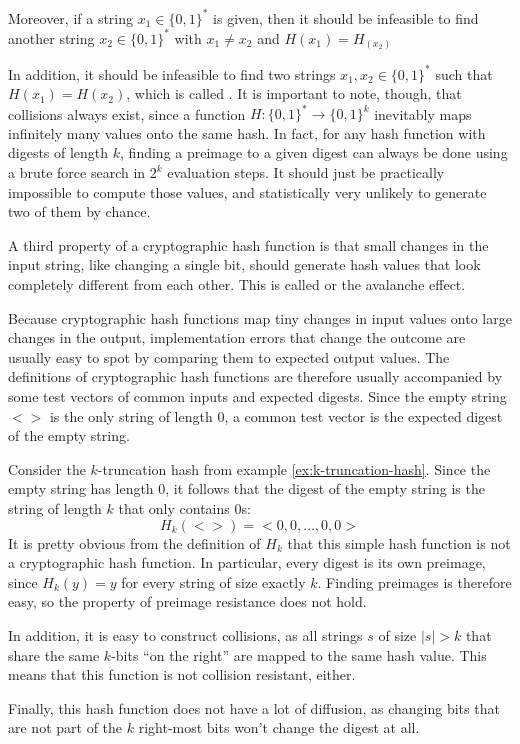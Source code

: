Moreover, if a string $x_1\in\{0,1\}^*$ is given, then it should be infeasible to find another string $x_2\in\{0,1\}^*$ with $x_1\neq x_2$ and $H(x_1)=H_(x_2)$

In addition, it should be infeasible to find two strings $x_1,x_2 \in\{0,1\}^*$ such that $H(x_1)=H(x_2)$, which is called . It is important to note, though, that collisions always exist, since a function $H: \{0,1\}^* \to \{0,1\}^k$ inevitably maps infinitely many values onto the same hash. In fact, for any hash function with digests of length $k$, finding a preimage to a given digest can always be done using a brute force search in $2^k$ evaluation steps. It should just be practically impossible to compute those values, and statistically very unlikely to generate two of them by chance.

A third property of a cryptographic hash function is that small changes in the input string, like changing a single bit, should generate hash values that look completely different from each other. This is called  or the avalanche effect.

Because cryptographic hash functions map tiny changes in input values onto large changes in the output, implementation errors that change the outcome are usually easy to spot by comparing them to expected output values. The definitions of cryptographic hash functions are therefore usually accompanied by some test vectors of common inputs and expected digests. Since the empty string $<>$ is the only string of length $0$, a common test vector is the expected digest of the empty string.
\begin{example} Consider the $k$-truncation hash from example \ref{ex:k-truncation-hash}. Since the empty string has length $0$, it follows that the digest of the empty string is the string of length $k$ that only contains $0$s:
\begin{equation}
H_k(<>)= <0,0,\ldots, 0,0>
\end{equation}
It is pretty obvious from the definition of $H_k$ that this simple hash function is not a cryptographic hash function. In particular, every digest is its own preimage, since $H_k(y)=y$ for every string of size exactly $k$. Finding preimages is therefore easy, so the property of preimage resistance does not hold.

In addition, it is easy to construct collisions, as all strings $s$ of size $|s|>k$ that share the same $k$-bits ``on the right'' are mapped to the same hash value. This means that this function is not collision resistant, either.

Finally, this hash function does not have a lot of diffusion, as changing bits that are not part of the $k$ right-most bits won't change the digest at all.
\end{example}

